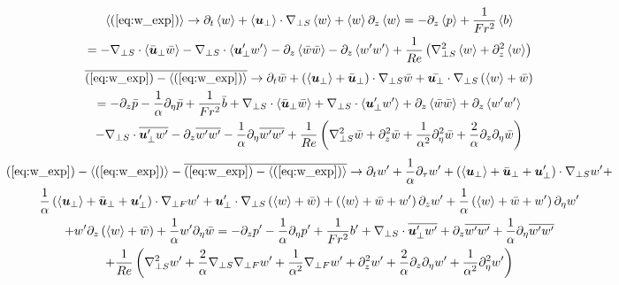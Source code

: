 \documentclass{article}
\begin{document}
\begin{multline}
    \left<(\ref{eq:w_exp})\right> \to \partial_t \left<w\right> +
    \left<\boldsymbol{u}_{\perp}\right>\cdot\nabla_{\perp S}\left<w\right> 
     + \left<w\right>\partial_z\left<w\right> = - \partial_z\left<p\right> +
     \frac{1}{Fr^2}\left<b\right>\\
    = -\nabla_{\perp S}\cdot\left<\bar{\boldsymbol{u}}_{\perp} \bar{w}\right> -
    \nabla_{\perp S}\cdot\left<\boldsymbol{u}'_{\perp} w'\right>-\partial_z\left<\bar{w}\bar{w}\right> - \partial_z\left<w'w'\right>
    + \frac{1}{Re}\left(\nabla_{\perp S}^2\left<w\right> + \partial_z^2\left<w\right>\right)
    \label{eq:w_bracket_eq}
\end{multline}
\begin{multline}
    \overline{(\ref{eq:w_exp}) - \left<(\ref{eq:w_exp})\right>} \to \partial_t \bar{w} +
    \left(\left<\boldsymbol{u}_{\perp}\right> + \bar{\boldsymbol{u}}_{\perp}\right)\cdot\nabla_{\perp S} \bar{w} +
    \bar{\boldsymbol{u}_{\perp}} \cdot\nabla_{\perp S}\left(\left<w\right> + \bar{w}\right) \\= - \partial_z
    \bar{p} - \frac{1}{\alpha}\partial_{\eta}\bar{p} + \frac{1}{Fr^2}\bar{b}
    + \nabla_{\perp S}\cdot\left<\bar{\boldsymbol{u}}_{\perp}\bar{w}\right>+ 
    \nabla_{\perp S}\cdot\left<\boldsymbol{u}_{\perp}'w'\right> + \partial_z\left<\bar{w}\bar{w}\right> +
    \partial_z\left<w'w'\right> \\
    - \nabla_{\perp S}\cdot\overline{\boldsymbol{u}_{\perp}'w'} -
    \partial_z\overline{w'w'} - \frac{1}{\alpha}\partial_{\eta}\overline{w'w'} +
    \frac{1}{Re}\left(\nabla_{\perp S}^2\bar{w} + \partial_z^2\bar{w} +
    \frac{1}{\alpha^2}\partial_{\eta}^2\bar{w} +
    \frac{2}{\alpha}\partial_z\partial_{\eta}\bar{w}\right)\label{eq:w_bar_eq}
\end{multline}
\begin{multline}
    (\ref{eq:w_exp}) - \left<(\ref{eq:w_exp})\right> - \overline{(\ref{eq:w_exp}) -
    \left<(\ref{eq:w_exp})\right>} \to \partial_t w' +
    \frac{1}{\alpha}\partial_{\tau} w' + \left(\left<\boldsymbol{u}_{\perp}\right> +
    \bar{\boldsymbol{u}}_{\perp} + \boldsymbol{u}_{\perp}'\right)\cdot\nabla_{\perp S} w' +\\
    \frac{1}{\alpha}\left(\left<\boldsymbol{u}_{\perp}\right> +
    \bar{\boldsymbol{u}}_{\perp} + \boldsymbol{u}_{\perp}'\right)\cdot\nabla_{\perp F} w'
    + \boldsymbol{u}_{\perp}'\cdot\nabla_{\perp S}\left(\left<w\right> + \bar{w}\right)
    + \left(\left<w\right> + \bar{w} + w'\right)\partial_zw' + \frac{1}{\alpha}\left(\left<w\right> + \bar{w} + w'\right)\partial_{\eta}w'  \\
    +  w'\partial_z\left(\left<w\right> +
    \bar{w}\right) + \frac{1}{\alpha}w'\partial_{\eta}\bar{w}
     = -\partial_z p' - \frac{1}{\alpha}\partial_{\eta}p' + \frac{1}{Fr^2}b' + 
     \nabla_{\perp S}\cdot\overline{\boldsymbol{u}_{\perp}'w'} +
    \partial_z\overline{w'w'} + \frac{1}{\alpha}\partial_{\eta}\overline{w'w'}\\
    + \frac{1}{Re}\left(\nabla_{\perp S}^2w' + \frac{2}{\alpha}\nabla_{\perp S}\nabla_{\perp F} w' +
    \frac{1}{\alpha^2}\nabla_{\perp F} w' + \partial_z^2w' +
    \frac{2}{\alpha}\partial_z\partial_{\eta}w' +
    \frac{1}{\alpha^2}\partial_{\eta}^2w'\right) \label{eq:w_pert_eq}
\end{multline}
\end{document}
